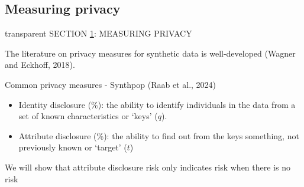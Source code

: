 \documentclass[t,8pt,utfx8]{beamer}
\begin{document}
\begin{spacing}{1.25}
{}


\section{Measuring privacy}\label{sec:privacy}
\begin{frame}[c,plain]
\vskip-4mm
\begin{beamercolorbox}[wd=\boxwidth,ht=22.11mm]{transparent}%
    \vfill%
    \leftinsert%
    \MakeUppercase{Section \ref{sec:privacy}: Measuring privacy
} %
\end{beamercolorbox}
\vskip-3mm

The literature on privacy measures for synthetic data is well-developed (Wagner and Eckhoff, 2018).  

Common privacy measures - Synthpop (Raab et al., 2024)

\begin{itemize}
    \item Identity disclosure (\%): the ability to identify individuals in the data from a set of known characteristics or `keys' ($q$).  
    \item Attribute disclosure (\%): the ability to find out from the keys something, not previously known or `target' ($t$)
\end{itemize}

We will show that attribute disclosure risk only indicates risk when there is no risk

\end{frame}

\end{spacing}
\end{document}
